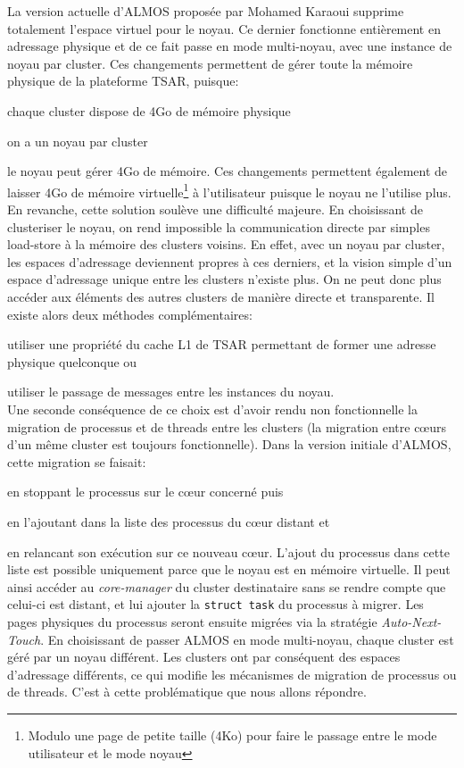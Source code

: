     La version actuelle d'ALMOS proposée par Mohamed Karaoui supprime totalement
    l'espace virtuel pour le noyau. Ce dernier fonctionne entièrement en
    adressage physique et de ce fait passe en mode multi-noyau, avec une
    instance de noyau par cluster. Ces changements permettent de gérer toute la
    mémoire physique de la plateforme TSAR, puisque: \benumline \item chaque
    cluster dispose de 4Go de mémoire physique \item on a un noyau par
    cluster \item le noyau peut gérer 4Go de mémoire\eenumline. Ces changements
    permettent également de laisser 4Go de mémoire virtuelle\footnote{Modulo une
      page de petite taille (4Ko) pour faire le passage entre le mode
      utilisateur et le mode noyau} à l'utilisateur puisque le noyau ne
    l'utilise plus.\\

    En revanche, cette solution soulève une difficulté majeure. En choisissant
    de clusteriser le noyau, on rend impossible la communication directe par
    simples load-store à la mémoire des clusters voisins. En effet, avec un
    noyau par cluster, les espaces d'adressage deviennent propres à ces
    derniers, et la vision simple d'un espace d'adressage unique entre les
    clusters n'existe plus. On ne peut donc plus accéder aux éléments des autres
    clusters de manière directe et transparente. Il existe alors deux méthodes
    complémentaires:\benumline \item utiliser une propriété du cache L1 de TSAR
    permettant de former une adresse physique quelconque ou \item utiliser le
    passage de messages entre les instances du noyau\eenumline.\\

    Une seconde conséquence de ce choix est d'avoir rendu non fonctionnelle la
    migration de processus et de threads entre les clusters (la migration entre
    c\oe urs d'un même cluster est toujours fonctionnelle). Dans la version
    initiale d'ALMOS, cette migration se faisait:\benumline \item en stoppant le
    processus sur le c\oe ur concerné puis \item en l'ajoutant dans la liste des
    processus du c\oe ur distant et \item en relancant son exécution sur ce
    nouveau c\oe ur\eenumline. L'ajout du processus dans cette liste est
    possible uniquement parce que le noyau est en mémoire virtuelle. Il peut
    ainsi accéder au \textit{core-manager} du cluster destinataire sans se
    rendre compte que celui-ci est distant, et lui ajouter la \texttt{struct
      task} du processus à migrer. Les pages physiques du processus seront
    ensuite migrées via la stratégie \textit{Auto-Next-Touch}. En choisissant de
    passer ALMOS en mode multi-noyau, chaque cluster est géré par un noyau
    différent. Les clusters ont par conséquent des espaces d'adressage
    différents, ce qui modifie les mécanismes de migration de processus ou de
    threads. C'est à cette problématique que nous allons répondre.


